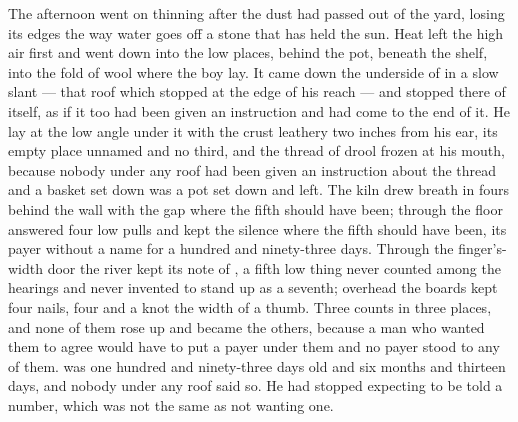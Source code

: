 The afternoon went on thinning after the dust had passed out of the yard, losing its edges the way water goes off a stone that has held the sun. Heat left the high air first and went down into the low places, behind the pot, beneath the shelf, into the fold of wool where the boy lay. It came down the underside of  in a slow slant --- that roof which stopped at the edge of his reach --- and stopped there of itself, as if it too had been given an instruction and had come to the end of it. He lay at the low angle under it with the crust leathery two inches from his ear, its empty place unnamed and no third, and the thread of drool frozen at his mouth, because nobody under any roof had been given an instruction about the thread and a basket set down was a pot set down and left. The kiln drew breath in fours behind the wall with the gap where the fifth should have been; through the floor  answered four low pulls and kept the silence where the fifth should have been, its payer without a name for a hundred and ninety-three days. Through the finger's-width door the river kept its note of , a fifth low thing never counted among the hearings and never invented to stand up as a seventh; overhead the boards kept four nails, four and a knot the width of a thumb. Three counts in three places, and none of them rose up and became the others, because a man who wanted them to agree would have to put a payer under them and no payer stood to any of them.  was one hundred and ninety-three days old and six months and thirteen days, and nobody under any roof said so. He had stopped expecting to be told a number, which was not the same as not wanting one.

